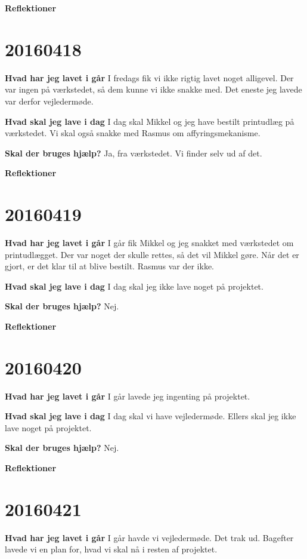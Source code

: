 \documentclass{article}
\begin{document}
	\textbf{Reflektioner}
	
	\section{20160418}
	
	\textbf{Hvad har jeg lavet i går}
	I fredags fik vi ikke rigtig lavet noget alligevel. Der var ingen på værkstedet, så dem kunne vi ikke snakke med. Det eneste jeg lavede var derfor vejledermøde.  
	
	\textbf{Hvad skal jeg lave i dag}
	I dag skal Mikkel og jeg have bestilt printudlæg på værkstedet. Vi skal også snakke med Rasmus om affyringsmekanisme. 
	
	\textbf{Skal der bruges hjælp?}
	Ja, fra værkstedet. Vi finder selv ud af det. 
	
	\textbf{Reflektioner}

	\section{20160419}
	
	\textbf{Hvad har jeg lavet i går}
	I går fik Mikkel og jeg snakket med værkstedet om printudlægget. Der var noget der skulle rettes, så det vil Mikkel gøre. Når det er gjort, er det klar til at blive bestilt. Rasmus var der ikke. 
	
	\textbf{Hvad skal jeg lave i dag}
	I dag skal jeg ikke lave noget på projektet. 
	
	\textbf{Skal der bruges hjælp?}
	Nej.  
	
	\textbf{Reflektioner}
	
	\section{20160420}
	
	\textbf{Hvad har jeg lavet i går}
	I går lavede jeg ingenting på projektet. 
	
	\textbf{Hvad skal jeg lave i dag}
	I dag skal vi have vejledermøde. Ellers skal jeg ikke lave noget på projektet. 
	
	\textbf{Skal der bruges hjælp?}
	Nej.  
	
	\textbf{Reflektioner}
	
	\section{20160421}
	
	\textbf{Hvad har jeg lavet i går}
	I går havde vi vejledermøde. Det trak ud. Bagefter lavede vi en plan for, hvad vi skal nå i resten af projektet. 
	
\end{document}
